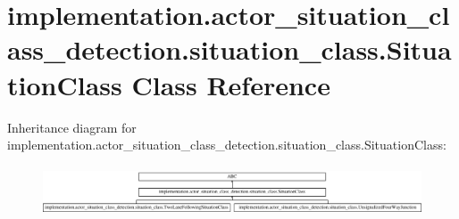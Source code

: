 \hypertarget{classimplementation_1_1actor__situation__class__detection_1_1situation__class_1_1_situation_class}{}\section{implementation.\+actor\+\_\+situation\+\_\+class\+\_\+detection.\+situation\+\_\+class.\+Situation\+Class Class Reference}
\label{classimplementation_1_1actor__situation__class__detection_1_1situation__class_1_1_situation_class}
Inheritance diagram for implementation.\+actor\+\_\+situation\+\_\+class\+\_\+detection.\+situation\+\_\+class.\+Situation\+Class\+:\begin{figure}[H]
\begin{center}
\leavevmode
\includegraphics[height=1.510791cm]{classimplementation_1_1actor__situation__class__detection_1_1situation__class_1_1_situation_class}
\end{center}
\end{figure}
